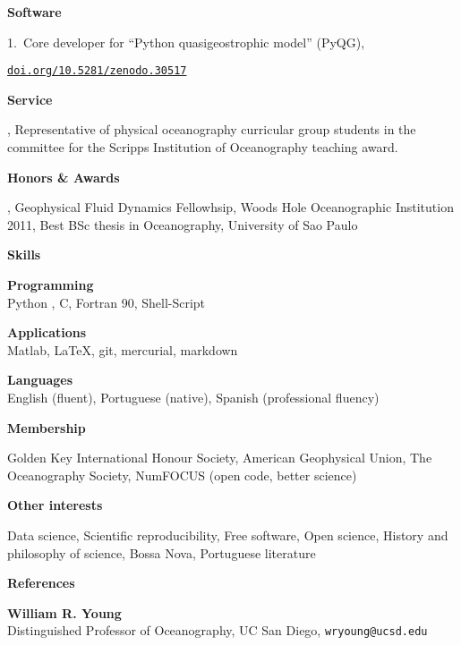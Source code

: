 \documentclass[a4paper,11pt,final]{memoir}
\newcommand{\Sep}{\vspace{1.5em}}
\newcommand{\SmallSep}{\vspace{0.5em}}
\newcommand{\CVSection}[1]
    {\Large\textbf{#1}\par
    \SmallSep\normalsize\normalfont}
\newcommand{\CVItem}[1]
    {\textbf{\color{NavyBlue} #1}}
\begin{document}
\Sep

\clearpage
\framebreak
\framebreak



\CVSection{Software}

1.\, Core developer for ``Python quasigeostrophic model'' (PyQG),

\href{http://dx.doi.org/10.5281/zenodo.30517}{\texttt{doi.org/10.5281/zenodo.30517}} 

\Sep


\CVSection{Service}
2015, Representative of physical oceanography curricular group students in the committee for
the Scripps Institution of Oceanography teaching award.


\Sep

\CVSection{Honors \& Awards}
2015, Geophysical Fluid Dynamics Fellowhsip, Woods Hole Oceanographic Institution\\
2011, Best BSc thesis in Oceanography, University of Sao Paulo\\

\Sep

\CVSection{Skills}

\CVItem{Programming}\\
Python , C, Fortran 90, Shell-Script
\SmallSep

\CVItem{Applications}\\
Matlab, \LaTeX, git, mercurial, markdown
\SmallSep

\CVItem{Languages}\\
English (fluent), Portuguese (native), Spanish (professional fluency)

\Sep

\CVSection{Membership}

Golden Key International Honour Society, American Geophysical Union, The Oceanography Society, NumFOCUS (open code, better science)

\Sep

\CVSection{Other interests}

Data science, Scientific reproducibility, Free software, Open science, History and philosophy of science,
 Bossa Nova, Portuguese literature 

\Sep

\CVSection{References}

\CVItem{William R. Young}\\
Distinguished Professor of Oceanography, UC San Diego, \texttt{wryoung@ucsd.edu}
\end{document}

